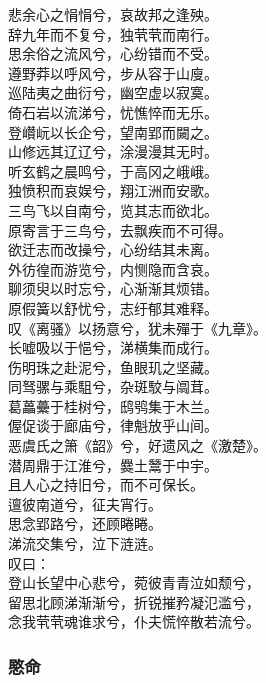 \documentclass[]{article}
\begin{document}
悲余心之悁悁兮，哀故邦之逢殃。\\
辞九年而不复兮，独茕茕而南行。\\
思余俗之流风兮，心纷错而不受。\\
遵野莽以呼风兮，步从容于山廋。\\
巡陆夷之曲衍兮，幽空虚以寂寞。\\
倚石岩以流涕兮，忧憔悴而无乐。\\
登巑岏以长企兮，望南郢而闚之。\\
山修远其辽辽兮，涂漫漫其无时。\\
听玄鹤之晨鸣兮，于高冈之峨峨。\\
独愤积而哀娱兮，翔江洲而安歌。\\
三鸟飞以自南兮，览其志而欲北。\\
原寄言于三鸟兮，去飘疾而不可得。\\
欲迁志而改操兮，心纷结其未离。\\
外彷徨而游览兮，内恻隐而含哀。\\
聊须臾以时忘兮，心渐渐其烦错。\\
原假簧以舒忧兮，志纡郁其难释。\\
叹《离骚》以扬意兮，犹未殫于《九章》。\\
长嘘吸以于悒兮，涕横集而成行。\\
伤明珠之赴泥兮，鱼眼玑之坚藏。\\
同驽骡与乘駔兮，杂斑駮与阘茸。\\
葛藟虆于桂树兮，鸱鸮集于木兰。\\
偓促谈于廊庙兮，律魁放乎山间。\\
恶虞氏之箫《韶》兮，好遗风之《激楚》。\\
潜周鼎于江淮兮，爨土鬵于中宇。\\
且人心之持旧兮，而不可保长。\\
邅彼南道兮，征夫宵行。\\
思念郢路兮，还顾睠睠。\\
涕流交集兮，泣下涟涟。\\
叹曰：\\
登山长望中心悲兮，菀彼青青泣如颓兮，\\
留思北顾涕渐渐兮，折锐摧矜凝氾滥兮，\\
念我茕茕魂谁求兮，仆夫慌悴散若流兮。

\hypertarget{header-n351}{%
\subsubsection{愍命}\label{header-n351}}
\end{document}
